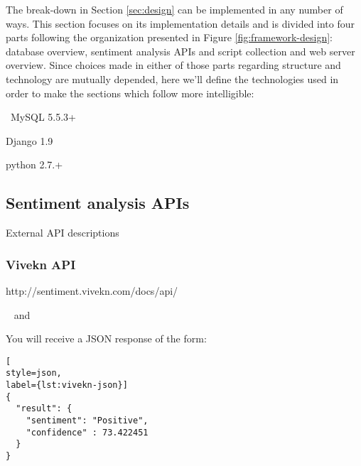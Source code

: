 \newcommand*{\ImplementationPath}{04-framework/02-implementation}

The break-down in Section \ref{sec:design} can be implemented in any number of ways. 
This section focuses on its implementation details and is divided into four parts following the organization presented in Figure \ref{fig:framework-design}: database overview, sentiment analysis APIs and script collection and web server overview. 
Since choices made in either of those parts regarding structure and technology are mutually depended, here we'll define the technologies used in order to make the sections which follow more intelligible:
\begin{description}
\singlespacing
 \item[DBMS:] MySQL 5.5.3+
 \item[Web framework:] Django 1.9 
 \item[Sentiment analysis scripts:] python 2.7.+
\end{description}



\subsection{Sentiment analysis APIs\label{sec:apis}}
External API descriptions

\subsubsection*{Vivekn API}
\begin{description}
\singlespacing
 \item[Web url:] http://sentiment.vivekn.com/docs/api/
 \item[Database columns:]  and 
\end{description}
You will receive a JSON response of the form:
\begin{lstlisting}[
style=json,
label={lst:vivekn-json}]
{ 
  "result": { 
    "sentiment": "Positive", 
    "confidence" : 73.422451 
  } 
}
\end{lstlisting}

